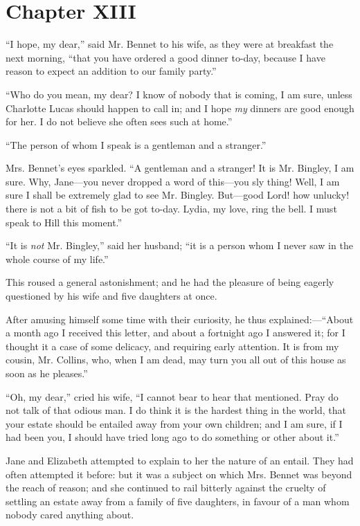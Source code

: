 \documentclass[12pt,openright]{book}
\begin{document}
\chapter{Chapter XIII}

\noindent  “I hope, my dear,” said Mr. Bennet to his wife, as they were at breakfast the next morning, “that you have ordered a good dinner to-day, because I have reason to expect an addition to our family party.”

“Who do you mean, my dear? I know of nobody that is coming, I am sure, unless Charlotte Lucas should happen to call in; and I hope \textit{my} dinners are good enough for her. I do not believe she often sees such at home.”

“The person of whom I speak is a gentleman and a stranger.”

Mrs. Bennet’s eyes sparkled. “A gentleman and a stranger! It is Mr. Bingley, I am sure. Why, Jane—you never dropped a word of this—you sly thing! Well, I am sure I shall be extremely glad to see Mr. Bingley. But—good Lord! how unlucky! there is not a bit of fish to be got to-day. Lydia, my love, ring the bell. I must speak to Hill this moment.”

“It is \textit{not} Mr. Bingley,” said her husband; “it is a person whom I never saw in the whole course of my life.”

This roused a general astonishment; and he had the pleasure of being eagerly questioned by his wife and five daughters at once.

After amusing himself some time with their curiosity, he thus explained:—“About a month ago I received this letter, and about a fortnight ago I answered it; for I thought it a case of some delicacy, and requiring early attention. It is from my cousin, Mr. Collins, who, when I am dead, may turn you all out of this house as soon as he pleases.”

“Oh, my dear,” cried his wife, “I cannot bear to hear that mentioned. Pray do not talk of that odious man. I do think it is the hardest thing in the world, that your estate should be entailed away from your own children; and I am sure, if I had been you, I should have tried long ago to do something or other about it.”

Jane and Elizabeth attempted to explain to her the nature of an entail. They had often attempted it before: but it was a subject on which Mrs. Bennet was beyond the reach of reason; and she continued to rail bitterly against the cruelty of settling an estate away from a family of five daughters, in favour of a man whom nobody cared anything about.
\end{document}
